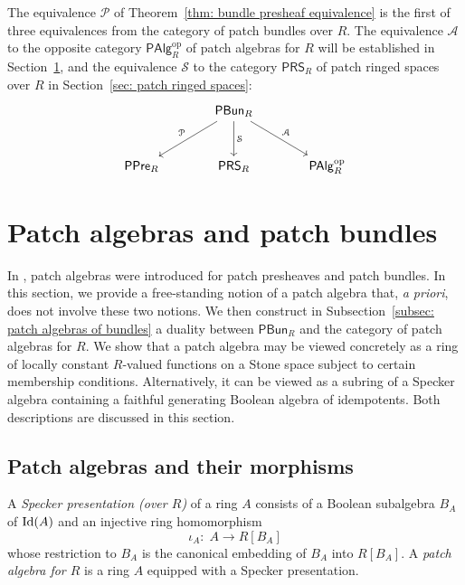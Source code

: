 \documentclass[11pt]{amsart}
\begin{document}
The equivalence $\mathcal P$ of Theorem~\ref{thm: bundle presheaf equivalence} is the first of three equivalences from the category of patch bundles over $R$. The equivalence $\mathcal A$ to the opposite category $\mathsf{PAlg}_R^{\mathrm{op}}$ of patch algebras for $R$ will be established in Section~\ref{sec: patch algebras and patch bundles}, and the  equivalence $\mathcal S$ to the category $\mathsf{PRS}_R$ of patch ringed spaces over $R$ in Section~\ref{sec: patch ringed spaces}:
\[
\begin{tikzcd}[column sep=large, row sep=large]
& \mathsf{PBun}_R
  \arrow[dl, "\mathcal P"']
  \arrow[d, "\mathcal S"]
  \arrow[dr, "\mathcal A"] & \\
\mathsf{PPre}_R & \mathsf{PRS}_R & \mathsf{PAlg}_R^{\mathrm{op}}
\end{tikzcd}
\]


\section[Patch algebras and patch bundles]{Patch algebras and patch bundles}\label{sec: patch algebras and patch bundles}

In \cite{CosOlb}, patch algebras were introduced for patch presheaves and  patch bundles. In this section, we provide a   free-standing notion of a patch algebra   that, {\it a priori}, does not involve these two notions. We then construct in Subsection~\ref{subsec: patch algebras of bundles} a duality between $\mathsf{PBun}_R$ and the category of patch algebras for $R$.
We show that a patch algebra may be viewed concretely as a ring of locally constant $R$-valued functions on a Stone space subject to certain membership conditions. Alternatively, it can be viewed as a subring of a Specker algebra containing a faithful generating Boolean algebra of idempotents. Both descriptions are discussed in this section.

\subsection[Patch algebras and their morphisms]{Patch algebras and their morphisms}

\begin{definition}\label{dfn: patch algebra}
 A {\it Specker presentation (over $R$)} of a ring $A$ consists of a Boolean subalgebra $B_A$ of $\mbox{\rm Id}(A)$ and an injective ring homomorphism
$$
\iota_A\colon\; A\longrightarrow R[B_A]
$$
whose restriction to $B_A$ is the canonical embedding of $B_A$ into $R[B_A]$. A {\it patch algebra for $R$} is a ring $A$ equipped with a Specker presentation.
\end{definition}
\end{document}
